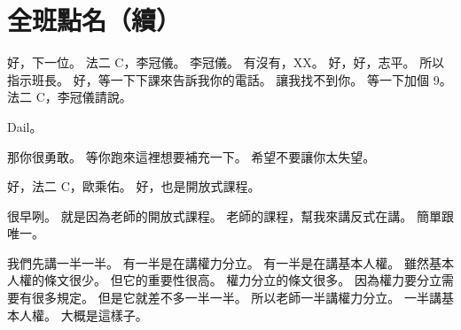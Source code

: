 \section{全班點名（續）}

\hypertarget{c01:cue:2590}{}好，下一位。
\hypertarget{c01:cue:2591}{}法二 C，李冠儀。
\hypertarget{c01:cue:2592}{}李冠儀。
\hypertarget{c01:cue:2593}{}有沒有，XX。
\hypertarget{c01:cue:2594}{}好，好，志平。
\hypertarget{c01:cue:2595}{}所以指示班長。
\hypertarget{c01:cue:2596}{}好，等一下下課來告訴我你的電話。
\hypertarget{c01:cue:2597}{}讓我找不到你。
\hypertarget{c01:cue:2598}{}等一下加個 9。
\hypertarget{c01:cue:2599}{}法二 C，李冠儀請說。

\hypertarget{c01:cue:2600}{}Dail。

\hypertarget{c01:cue:2601}{}那你很勇敢。
\hypertarget{c01:cue:2602}{}等你跑來這裡想要補充一下。
\hypertarget{c01:cue:2603}{}希望不要讓你太失望。

\hypertarget{c01:cue:2604}{}好，法二 C，歐乘佑。
\hypertarget{c01:cue:2605}{}好，也是開放式課程。

\hypertarget{c01:cue:2606}{}很早咧。
\hypertarget{c01:cue:2607}{}就是因為老師的開放式課程。
\hypertarget{c01:cue:2608}{}老師的課程，幫我來講反式在講。
\hypertarget{c01:cue:2609}{}簡單跟唯一。

\hypertarget{c01:cue:2610}{}我們先講一半一半。
\hypertarget{c01:cue:2611}{}有一半是在講權力分立。
\hypertarget{c01:cue:2612}{}有一半是在講基本人權。
\hypertarget{c01:cue:2613}{}雖然基本人權的條文很少。
\hypertarget{c01:cue:2614}{}但它的重要性很高。
\hypertarget{c01:cue:2615}{}權力分立的條文很多。
\hypertarget{c01:cue:2616}{}因為權力要分立需要有很多規定。
\hypertarget{c01:cue:2617}{}但是它就差不多一半一半。
\hypertarget{c01:cue:2618}{}所以老師一半講權力分立。
\hypertarget{c01:cue:2619}{}一半講基本人權。
\hypertarget{c01:cue:2620}{}大概是這樣子。

